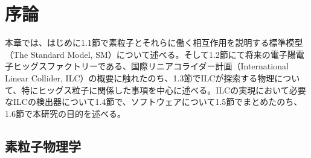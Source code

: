 
\chapter{序論} \label{sec:Intruduction}
本章では、はじめに1.1節で素粒子とそれらに働く相互作用を説明する標準模型（The Standard Model, SM）について述べる。そして1.2節にて将来の電子陽電子ヒッグスファクトリーである、国際リニアコライダー計画（International Linear Collider, ILC）の概要に触れたのち、1.3節でILCが探索する物理について、特にヒッグス粒子に関係した事項を中心に述べる。ILCの実現において必要なILCの検出器について1.4節で、ソフトウェアについて1.5節でまとめたのち、1.6節で本研究の目的を述べる。
\section{素粒子物理学}

